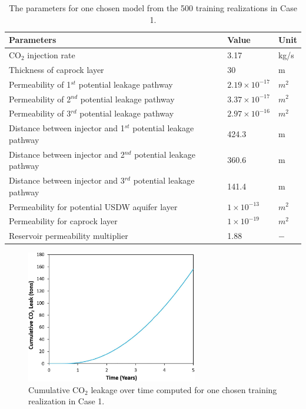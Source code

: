 \documentclass[a4paper,fleqn]{cas-sc}
\begin{document}
\begin{table}[width=.9\linewidth,cols=3,pos=h]
    \caption{The parameters for one chosen model from the 500 training realizations in Case 1.}\label{tbl:2}
    \begin{tabular*}{\tblwidth}{@{} LLL@{} }
    \toprule
    \textbf{Parameters} & \textbf{Value} & \textbf{Unit}  \\
    \midrule
    CO$_2$ injection rate & 3.17 & kg/s \\
    Thickness of caprock layer & 30 & m \\
    Permeability of 1$^{st}$ potential leakage pathway & $2.19\times 10^{-17}$ & $m^2$ \\
    Permeability of 2$^{nd}$ potential leakage pathway & $3.37\times 10^{-17}$ & $m^2$ \\
    Permeability of 3$^{rd}$ potential leakage pathway & $2.97\times 10^{-16}$ & $m^2$ \\
    Distance between injector and 1$^{st}$ potential leakage pathway & 424.3 & m \\
    Distance between injector and 2$^{nd}$ potential leakage pathway & 360.6 & m \\
    Distance between injector and 3$^{rd}$ potential leakage pathway & 141.4 & m \\
    Permeability for potential USDW aquifer layer & $1\times 10^{-13}$ & $m^2$ \\
    Permeability for caprock layer & $1\times 10^{-19}$ & $m^2$  \\
    Reservoir permeability multiplier & 1.88 & $-$   \\  
    \bottomrule
    \end{tabular*}
\end{table}

\begin{figure}
    \centering
    \includegraphics[width=7.5cm]{figs/Figure 8.pdf}
    \caption{Cumulative CO$_2$ leakage over time computed for one chosen training realization in Case 1.}
    \label{cum_leak_line}
\end{figure}
\end{document}
